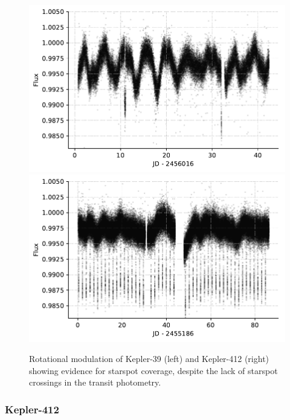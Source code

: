 \begin{figure}
    \centering
    \includegraphics[scale=0.6]{robin/kepler36_rotation.pdf}
    \includegraphics[scale=0.6]{robin/kepler412_rotation.pdf}
    \caption{Rotational modulation of Kepler-39 (left) and Kepler-412 (right) showing evidence for starspot coverage, despite the lack of starspot crossings in the transit photometry.}
    \label{fig:rotation_modulation}
\end{figure}

\subsubsection{Kepler-412}

